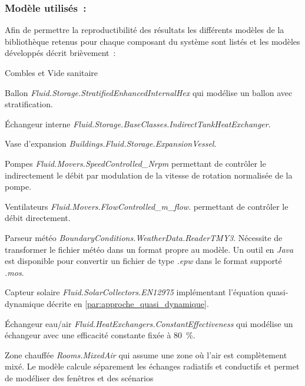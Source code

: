 \subsubsection{Modèle utilisés~:} %
\label{ssub:modele_utilises}
Afin de permettre la reproductibilité des résultats les différents
modèles de la bibliothèque 
retenus pour chaque composant du système sont listés et les modèles développés
décrit brièvement~:
\begin{blockdescription}{Combles et Vide sanitaire}
    \item [Ballon] \textit{Fluid.Storage.StratifiedEnhancedInternalHex} qui modélise
                   un ballon avec stratification.
    \item [Échangeur interne] \textit{Fluid.Storage.BaseClasses.IndirectTankHeatExchanger}.
    \item [Vase d’expansion] \textit{Buildings.Fluid.Storage.ExpansionVessel}.
    \item [Pompes] \textit{Fluid.Movers.SpeedControlled\_Nrpm} permettant
                   de contrôler le indirectement le débit par modulation de la vitesse
                   de rotation normalisée de la pompe.
    \item [Ventilateurs] \textit{Fluid.Movers.FlowControlled\_m\_flow}.
                          permettant de contrôler le débit directement.
    \item [Parseur météo] \textit{BoundaryConditions.WeatherData.ReaderTMY3}.
                          Nécessite de transformer le fichier météo dans un format propre au modèle.
                          Un outil en \textit{Java} est disponible pour convertir un fichier de
                          type \textit{.epw} dans le format supporté \textit{.mos}.
    \item [Capteur solaire] \textit{Fluid.SolarCollectors.EN12975} implémentant
          l’équation quasi-dynamique décrite en \ref{par:approche_quasi_dynamique}.
    \item [Échangeur eau/air] \textit{Fluid.HeatExchangers.ConstantEffectiveness} qui
          modélise un échangeur avec une efficacité constante fixée à \SI{80}{\percent}.
    \item [Zone chauffée] \textit{Rooms.MixedAir} qui assume une zone où l’air est
          complètement mixé. Le modèle calcule séparement les échanges radiatifs
          et conductifs et permet de modéliser des fenêtres et des scénarios

\end{blockdescription}

